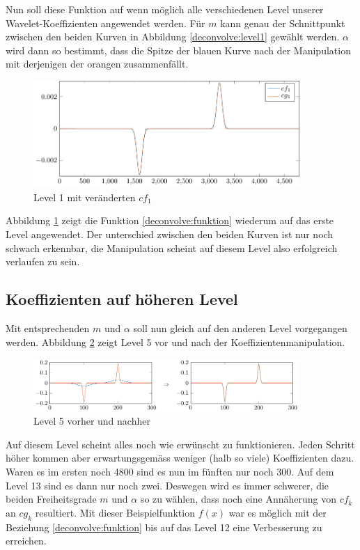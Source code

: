 Nun soll diese Funktion auf wenn möglich alle verschiedenen Level unserer Wavelet-Koeffizienten angewendet werden.
Für $m$ kann genau der Schnittpunkt zwischen den beiden Kurven in Abbildung \ref{deconvolve:level1} gewählt werden.
$\alpha$ wird dann so bestimmt, dass die Spitze der blauen Kurve nach der Manipulation mit derjenigen der orangen zusammenfällt.
\begin{figure}[h]
\centering
\includegraphics[width=0.9\textwidth]{./papers/deconvolve/pictures/level/level1_n.pdf}
\caption{Level 1 mit veränderten $cf_1$\label{deconvolve:level1_n}}
\end{figure}

Abbildung \ref{deconvolve:level1_n} zeigt die Funktion \eqref{deconvolve:funktion} wiederum auf das erste Level angewendet.
Der unterschied zwischen den beiden Kurven ist nur noch schwach erkennbar, die Manipulation scheint auf diesem Level also erfolgreich verlaufen zu sein.

\subsection{Koeffizienten auf höheren Level}

Mit entsprechenden $m$ und $\alpha$ soll nun gleich auf den anderen Level vorgegangen werden.
Abbildung \ref{deconvolve:level5} zeigt Level 5 vor und nach der Koeffizientenmanipulation.
\begin{figure}[h]
\centering
\includegraphics[width=0.9\textwidth]{./papers/deconvolve/pictures/level/level5.pdf}
\caption{Level 5 vorher und nachher\label{deconvolve:level5}}
\end{figure}

Auf diesem Level scheint alles noch wie erwünscht zu funktionieren.
Jeden Schritt höher kommen aber erwartungsgemäss weniger (halb so viele) Koeffizienten dazu.
Waren es im ersten noch 4800 sind es nun im fünften nur noch 300.
Auf dem Level 13 sind es dann nur noch zwei.
Deswegen wird es immer schwerer, die beiden Freiheitsgrade $m$ und $\alpha$ so zu wählen, dass noch eine Annäherung von $cf_k$ an $cg_k$ resultiert.
Mit dieser Beispielfunktion $f(x)$ war es möglich mit der Beziehung \eqref{deconvolve:funktion} bis auf das Level 12 eine Verbesserung zu erreichen.

